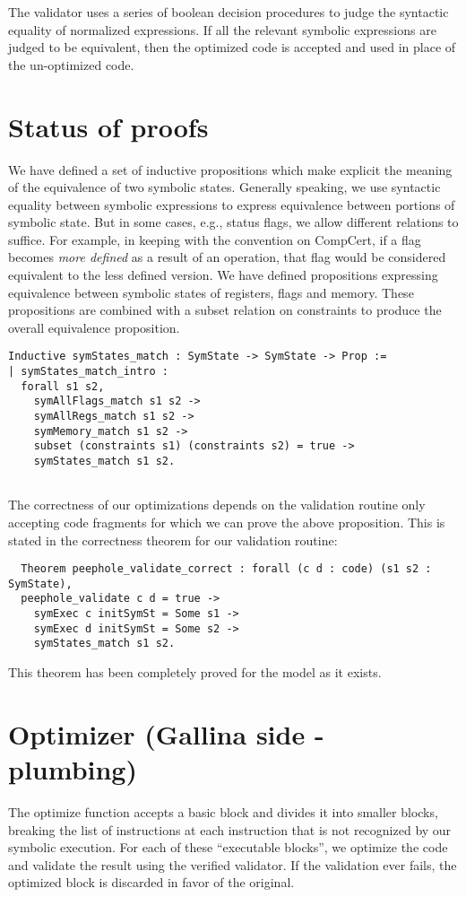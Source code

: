\documentclass{article}
\begin{document}
The validator uses a series of boolean decision procedures to judge
the syntactic equality of normalized expressions. If all the relevant
symbolic expressions are judged to be equivalent, then the optimized
code is accepted and used in place of the un-optimized code.

\section{Status of proofs}
We have defined a set of inductive propositions which make explicit
the meaning of the equivalence of two symbolic states. Generally
speaking, we use syntactic equality between symbolic expressions to
express equivalence between portions of symbolic state. But in some
cases, e.g., status flags, we allow different relations to
suffice. For example, in keeping with the convention on CompCert, if a
flag becomes {\it more defined} as a result of an operation, that flag
would be considered equivalent to the less defined version. We have
defined propositions expressing equivalence between symbolic states of
registers, flags and memory. These propositions are combined with a
subset relation on constraints to produce the overall equivalence
proposition.

\begin{verbatim}
Inductive symStates_match : SymState -> SymState -> Prop :=
| symStates_match_intro : 
  forall s1 s2, 
    symAllFlags_match s1 s2 ->
    symAllRegs_match s1 s2 ->
    symMemory_match s1 s2 ->
    subset (constraints s1) (constraints s2) = true ->
    symStates_match s1 s2. 
  
\end{verbatim}

The correctness of our optimizations depends on the validation routine
only accepting code fragments for which we can prove the above
proposition. This is stated in  the correctness theorem for our
validation routine:

\begin{verbatim}
  Theorem peephole_validate_correct : forall (c d : code) (s1 s2 : SymState),
  peephole_validate c d = true -> 
    symExec c initSymSt = Some s1 -> 
    symExec d initSymSt = Some s2 ->
    symStates_match s1 s2.
\end{verbatim}

This theorem has been completely proved for the model as it
exists.

\section{Optimizer (Gallina side - plumbing)}
The optimize function accepts a basic block and divides it into
smaller blocks, breaking the list of instructions at each instruction
that is not recognized by our symbolic execution.  For each of these
``executable blocks'', we optimize the code and validate the result
using the verified validator.  If the validation ever fails, the
optimized block is discarded in favor of the original.
\end{document}
